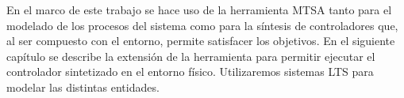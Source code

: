 En el marco de este trabajo se hace uso de la herramienta MTSA tanto para el modelado de los procesos del sistema como
para la síntesis de controladores que, al ser compuesto con el entorno, permite satisfacer los objetivos. En el
siguiente capítulo se describe la extensión de la herramienta para permitir ejecutar el controlador sintetizado en el
entorno físico. Utilizaremos sistemas LTS para modelar las distintas entidades.
